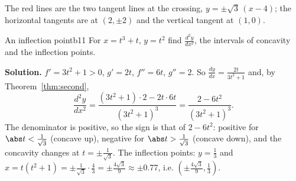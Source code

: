 \documentclass[11pt]{article}
\begin{document}
\begin{center}
\end{center}
The red lines are the two tangent lines at the crossing, $y=\pm\sqrt3\,(x-4)$; the horizontal tangents are at $(2,\pm2)$ and the vertical tangent at $(1,0)$.

\begin{exmp}{An inflection point}{b11}
For $x=t^3+t$, $y=t^2$ find $\frac{d^2y}{dx^2}$, the intervals of concavity and the inflection points.

\textbf{Solution.} $f'=3t^2+1>0$, $g'=2t$, $f''=6t$, $g''=2$. So $\frac{dy}{dx}=\frac{2t}{3t^2+1}$ and, by Theorem~\ref{thm:second},
\[
\frac{d^2y}{dx^2}=\frac{(3t^2+1)\cdot2-2t\cdot6t}{(3t^2+1)^3}=\frac{2-6t^2}{(3t^2+1)^3}.
\]
The denominator is positive, so the sign is that of $2-6t^2$: positive for $\abs t<\frac1{\sqrt3}$ (concave up), negative for $\abs t>\frac1{\sqrt3}$ (concave down), and the concavity changes at $t=\pm\frac1{\sqrt3}$. The inflection points: $y=\frac13$ and $x=t(t^2+1)=\pm\frac1{\sqrt3}\cdot\frac43=\pm\frac{4\sqrt3}9\approx\pm0.77$, i.e. $\left(\pm\frac{4\sqrt3}9,\frac13\right)$.
\end{exmp}
\end{document}
